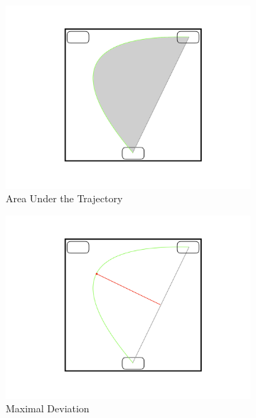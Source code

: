\documentclass{article}
\begin{document}
\begin{figure}
\centering
\begin{subfigure}[b]{0.3\textwidth}
\includegraphics[width=\textwidth]{AUC.pdf}
\caption{Area Under the Trajectory}
\end{subfigure}
%
\begin{subfigure}[b]{0.3\textwidth}
\includegraphics[width=\textwidth]{MD.pdf}
\caption{Maximal Deviation}
\end{subfigure}
%
\begin{subfigure}[b]{0.3\textwidth}

\end{subfigure}
\end{figure}
\end{document}
